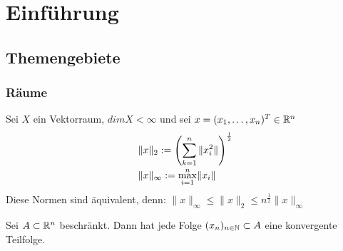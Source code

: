 \chapter*{Einf{\"u}hrung} 
  
  
  
\section{Themengebiete}



\subsection{R{\"a}ume}


Sei $X$ ein Vektorraum, $dim X < \infty $ und sei $x = (x_{1},\dotsc,x_{n})^{T} \in \mathbb{R}^{n}$
\begin{align*}
	& \|x\|_{2} := \left(\sum_{k = 1}^{n} \|x_{i}^{2}\| \right)^{\frac{1}{2}}\\
	& \|x\|_{\infty} := \smash{\displaystyle\max_{i = 1}^{n}}  \|x_{i}\|		
\end{align*}	

Diese Normen sind äquivalent, denn:
$\| x \|_{\infty} \leq \| x \|_{2} \leq n^{\frac{1}{2}} \| x \|_{\infty}$ \newline

\begin{satz}  \label{satz:1.1-BolzanoWeierstrass}
Sei $A \subset \mathbb{R}^{n}$ beschränkt. Dann hat jede Folge $(x_{n})_{n \in \mathbb{N}} \subset A$ eine konvergente Teilfolge.
\end{satz}


